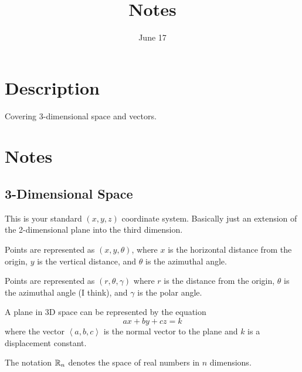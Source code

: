 \documentclass[12pt]{scrartcl}
\title{Notes}
\date{June 17}
\begin{document}
\maketitle

\pagebreak

\section{Description}

Covering 3-dimensional space and vectors.

\section{Notes}

\subsection{3-Dimensional Space}

\begin{definition}
    This is your standard $(x, y, z)$ coordinate system. Basically just an extension of the 2-dimensional plane into the third dimension.
\end{definition}

\begin{definition}
    Points are represented as $(x, y, \theta)$, where $x$ is the horizontal distance from the origin, $y$ is the vertical distance, and $\theta$ is the azimuthal angle.
\end{definition}

\begin{definition}
    Points are represented as $(r, \theta, \gamma)$ where $r$ is the distance from the origin, $\theta$ is the azimuthal angle (I think), and $\gamma$ is the polar angle.
\end{definition}

\begin{definition}
    A plane in 3D space can be represented by the equation
    \[ax + by + cz = k\]
    where the vector $\left<a, b, c\right>$ is the normal vector to the plane and $k$ is a displacement constant.
\end{definition}

\begin{definition}
    The notation $\mathbb R_{n}$ denotes the space of real numbers in $n$ dimensions.
\end{definition}
\end{document}
